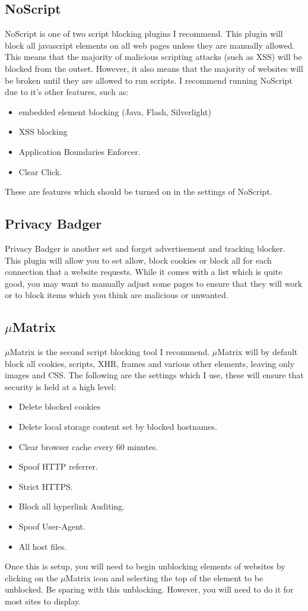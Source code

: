 \documentclass[a4paper,11pt]{report}
\begin{document}
		\subsection{NoScript}
			NoScript is one of two script blocking plugins I recommend. 
			This plugin will block all javascript elements on all web pages unless they are manually allowed. 
			This means that the majority of malicious scripting attacks (such as XSS) will be blocked from the outset. 
			However, it also means that the majority of websites will be broken until they are allowed to run scripts. 
			I recommend running NoScript due to it's other features, such as:
			\begin{itemize}
				\item embedded element blocking (Java, Flash, Silverlight) 
				\item XSS blocking
				\item Application Boundaries Enforcer. 
				\item Clear Click. 
			\end{itemize}
			These are features which should be turned on in the settings of NoScript. 
		\subsection{Privacy Badger}
			Privacy Badger is another set and forget advertisement and tracking blocker. 
			This plugin will allow you to set allow, block cookies or block all for each connection that a website requests. 
			While it comes with a list which is quite good, you may want to manually adjust some pages to ensure that they will work or to block items which you think are malicious or unwanted. 
		\subsection{$\mu{}$Matrix}
			$\mu$Matrix is the second script blocking tool I recommend. 
			$\mu{}$Matrix will by default block all cookies, scripts, XHR, frames and various other elements, leaving only images and CSS. 
			The following are the settings which I use, these will ensure that security is held at a high level:
			\begin{itemize}
				\item Delete blocked cookies
				\item Delete local storage content set by blocked hostnames. 
				\item Clear browser cache every 60 minutes. 
				\item Spoof HTTP referrer. 
				\item Strict HTTPS.
				\item Block all hyperlink Auditing. 
				\item Spoof User-Agent. 
				\item All host files. 
			\end{itemize}
			Once this is setup, you will need to begin unblocking elements of websites by clicking on the $\mu{}$Matrix icon and selecting the top of the element to be unblocked. 
			Be sparing with this unblocking. However, you will need to do it for most sites to display. 
\end{document}

